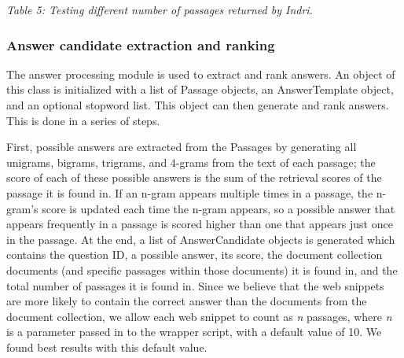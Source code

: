\documentclass[11pt]{article}
\begin{document}
\begin{table}
\begin{center}

\vspace{1mm}
\emph{Table 5: Testing different number of passages returned by Indri.}
\end{center}
\end{table}

\subsubsection{Answer candidate extraction and ranking}

The answer processing module is used to extract and rank answers.  An object of this class is initialized with a list of Passage objects, an AnswerTemplate object, and an optional stopword list.  This object can then generate and rank answers.  This is done in a series of steps.

First, possible answers are extracted from the Passages by generating all unigrams, bigrams, trigrams, and 4-grams from the text of each passage; the score of each of these possible answers is the sum of the retrieval scores of the passage it is found in.  If an n-gram appears multiple times in a passage, the n-gram's score is updated each time the n-gram appears, so a possible answer that appears frequently in a passage is scored higher than one that appears just once in the passage. At the end, a list of AnswerCandidate objects is generated which contains the question ID, a possible answer, its score, the document collection documents (and specific passages within those documents) it is found in, and the total number of passages it is found in.  Since we believe that the web snippets are more likely to contain the correct answer than the documents from the document collection, we allow each web snippet to count as \emph{n} passages, where \emph{n} is a parameter passed in to the wrapper script, with a default value of 10.  We found best results with this default value.
\end{document}
